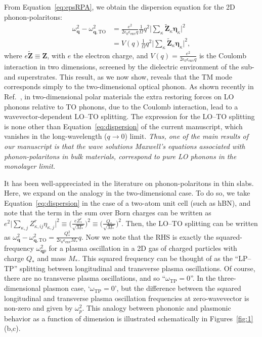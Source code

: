 \documentclass[aps,prb,twocolumn,
	           groupedaddress,superscriptaddress,
               amsfonts,amssymb,amsmath,floatfix,
	           citeautoscript]{revtex4-1}
\begin{document}
From Equation~\eqref{eq:epsRPA}, we obtain the dispersion equation for the 2D phonon-polaritons:
\begin{align}
    \omega^2_{\mathbf{q}} - \omega^2_{\mathbf{q},\mathrm{TO}} &= \frac{e^2}{2\epsilon_0\epsilon_{\mathrm{env}}q}\frac{1}{\Omega}q^2\Big|\sum\limits_{\kappa}\tilde{\mathbf{Z}}_{\kappa}\boldsymbol{\eta}_{\kappa}  \Big|^2 \nonumber \\
    &= V(q)\frac{1}{\Omega}q^2\Big|\sum\limits_{\kappa}\tilde{\mathbf{Z}}_{\kappa}\boldsymbol{\eta}_{\kappa}  \Big|^2,
    \label{eq:dispersion}
\end{align}
where $e\tilde{\mathbf{Z}} \equiv \mathbf{Z}$, with $e$ the electron charge, and $V(q)=\frac{e^2}{2\epsilon_0\epsilon_{\mathrm{env}}q}$ is the Coulomb interaction in two dimensions, screened by the dielectric environment of the sub- and superstrates. This result, as we now show, reveals that the TM mode corresponds simply to the two-dimensional optical phonon. As shown recently in Ref.~, in two-dimensional polar materials the extra restoring forces on LO phonons relative to TO phonons, due to the Coulomb interaction, lead to a wavevector-dependent LO--TO splitting. The expression for the LO--TO splitting is none other than Equation~\eqref{eq:dispersion} of the current manuscript, which vanishes in the long-wavelength ($q\rightarrow 0$) limit. \emph{Thus, one of the main results of our manuscript is that the wave solutions Maxwell's equations associated with phonon-polaritons in bulk materials, correspond to pure LO phonons in the monolayer limit.} 

It has been well-appreciated in the literature on phonon-polaritons in thin slabs. Here, we expand on the analogy in the two-dimensional case. To do so, we take Equation~\eqref{eq:dispersion} in the case of a two-atom unit cell (such as hBN), and note that the term in the sum over Born charges can be written as $e^2\big|\sum_{\kappa,j}Z^r_{\kappa,ij}\eta_{\kappa,j}  \big|^2 \equiv  \Big(\frac{eZ^r_*}{\sqrt{M_*}}\Big)^2 \equiv \Big(\frac{Q_*}{\sqrt{M_*}}\Big)^2$. Then, the LO--TO splitting can be written as $\omega^2_{\mathbf{q}} - \omega^2_{\mathbf{q},\mathrm{TO}} = \frac{Q_*^2}{2\epsilon_0\epsilon_{\mathrm{env}} M_*}q$. Now we note that the RHS is exactly the squared-frequency $\omega^2_{\mathbf{q}p}$ for a plasma oscillation in a 2D gas of charged particles with charge $Q_*$ and mass $M_*$. This squared frequency can be thought of as the ``LP--TP'' splitting between longitudinal and transverse plasma oscillations. Of course, there are no transverse plasma oscillations, and so ``$\omega_{\mathrm{TP}} = 0$''. In the three-dimensional plasmon case, `$\omega_{\mathrm{TP}} = 0$', but the difference between the squared longitudinal and transverse plasma oscillation frequencies at zero-wavevector is non-zero and given by $\omega_p^2$. This analogy between phononic and plasmonic behavior as a function of dimension is illustrated schematically in Figures~\ref{fig:1}(b,c).
\end{document}

